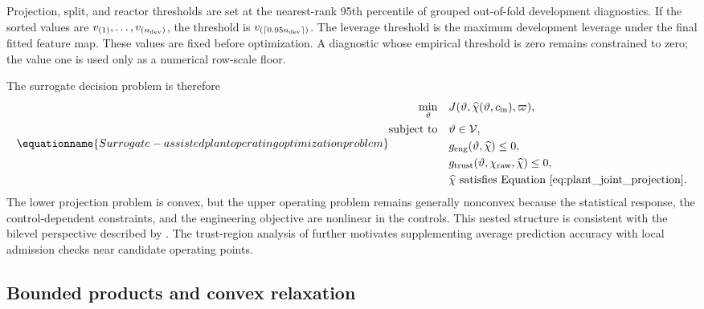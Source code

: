 Projection, split, and reactor thresholds are set at the nearest-rank 95th percentile of grouped out-of-fold development diagnostics. If the sorted values are $v_{(1)},\ldots,v_{(n_{\rm dev})}$, the threshold is $v_{(\lceil0.95n_{\rm dev}\rceil)}$. The leverage threshold is the maximum development leverage under the final fitted feature map. These values are fixed before optimization. A diagnostic whose empirical threshold is zero remains constrained to zero; the value one is used only as a numerical row-scale floor.

The surrogate decision problem is therefore
\begin{equation}
\equationname{Surrogate-assisted plant operating optimization problem}
\begin{aligned}
\min_{\vartheta}\quad&J(\vartheta,\widehat\chi(\vartheta,c_{\rm in}),\varpi),\\
\text{subject to}\quad&\vartheta\in\mathcal V,\\
&g_{\rm eng}(\vartheta,\widehat\chi)\le0,\\
&g_{\rm trust}(\vartheta,\chi_{\rm raw},\widehat\chi)\le0,\\
&\widehat\chi\text{ satisfies Equation~\eqref{eq:plant_joint_projection}}.
\end{aligned}
\label{eq:plant_surrogate_optimization}
\end{equation}
The lower projection problem is convex, but the upper operating problem remains generally nonconvex because the statistical response, the control-dependent constraints, and the engineering objective are nonlinear in the controls. This nested structure is consistent with the bilevel perspective described by \citet{Colson2007}. The trust-region analysis of \citet{Alexandrov1998} further motivates supplementing average prediction accuracy with local admission checks near candidate operating points.

\subsection{Bounded products and convex relaxation}


